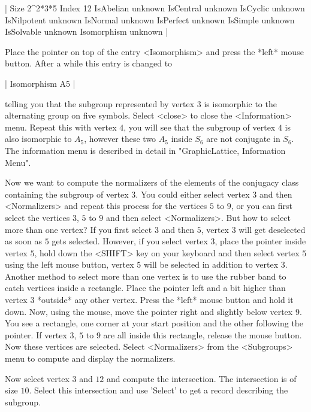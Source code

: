 |    Size            2^2*3*5
    Index           12
    IsAbelian       unknown
    IsCentral       unknown
    IsCyclic        unknown
    IsNilpotent     unknown
    IsNormal        unknown
    IsPerfect       unknown
    IsSimple        unknown
    IsSolvable      unknown
    Isomorphism     unknown |

Place the pointer on top of the entry  <Isomorphism> and press the *left*
mouse button.  After a while this entry is changed to

|    Isomorphism     A5 |

telling you that the subgroup represented by  vertex $3$ is isomorphic to
the alternating group  on   five symbols.  Select  <close>  to  close the
<Information>  menu.  Repeat this with vertex  $4$, you will see that the
subgroup of  vertex $4$ is also isomorphic   to $A_5$, however  these two
$A_5$ inside $S_6$ are  not conjugate in $S_6$.   The information menu is
described in detail in "GraphicLattice, Information Menu".

Now we want to compute the  normalizers of the  elements of the conjugacy
class containing the  subgroup of vertex  $3$.   You could either  select
vertex  $3$ and  then  <Normalizers>  and repeat   this process for   the
vertices $5$ to $9$, or you can first select the vertices $3$, $5$ to $9$
and  then select <Normalizers>.  But how  to select more than one vertex?
If you first select $3$ and  then $5$, vertex $3$  will get deselected as
soon as $5$ gets selected.  However, if you  select vertex $3$, place the
pointer inside vertex $5$, hold down the <SHIFT> key on your keyboard and
then select vertex $5$ using  the left mouse button,  vertex $5$ will  be
selected in addition to  vertex $3$.  Another  method to select more than
one  vertex is  to  use  the  rubber   band  to catch vertices  inside  a
rectangle.  Place  the pointer  left and  a  bit  higher than  vertex $3$
*outside*  any other vertex.   Press the *left*  mouse button and hold it
down.  Now, using  the mouse, move the  pointer right and slightly  below
vertex $9$.  You  see a rectangle, one corner  at your start position and
the other   following the pointer.   If  vertex $3$,  $5$ to $9$  are all
inside this rectangle, release the mouse  button.  Now these vertices are
selected.  Select <Normalizers> from the  <Subgroups> menu to compute and
display the normalizers.

Now select   vertex  $3$ and  $12$ and   compute   the intersection.  The
intersection is of size $10$.  Select this intersection and use  'Select'
to get a {\GAP} record describing the subgroup.

